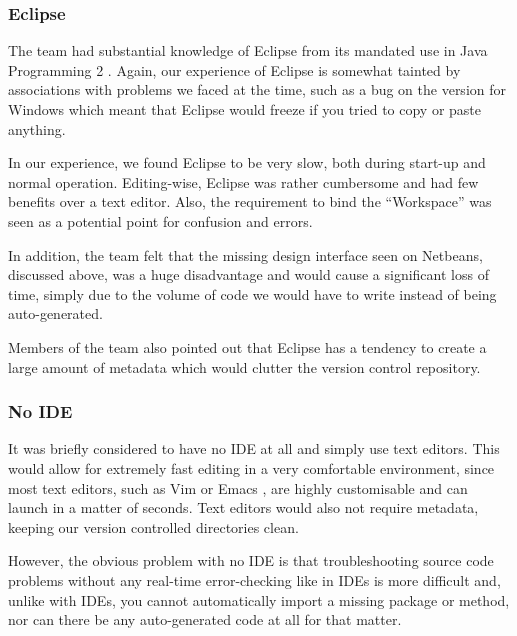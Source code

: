 \subsubsection{Eclipse}
\label{impl:ui:ide:eclipse}

The team had substantial knowledge of Eclipse from its mandated use in
Java Programming 2 \cite{javaProgramming2}. Again, our experience of 
Eclipse is somewhat tainted by associations with problems we faced at 
the time, such as a bug on the version for Windows which meant that 
Eclipse would freeze if you tried to copy or paste anything.

In our experience, we found Eclipse to be very slow, both during 
start-up and normal operation. 
Editing-wise, Eclipse was rather cumbersome and had few benefits over
a text editor.
Also, the requirement to bind the ``Workspace'' was seen as a potential
point for confusion and errors.

In addition, the team felt that the missing design interface seen on
Netbeans, discussed above, was a huge disadvantage and would cause a
significant loss of time, simply due to the volume of code we would
have to write instead of being auto-generated.

Members of the team also pointed out that Eclipse has a tendency to
create a large amount of metadata which would clutter the version
control repository.

\subsubsection{No IDE}
\label{impl:ui:ide:noide}

It was briefly considered to have no IDE at all and simply use text
editors.
This would allow for extremely fast editing in a very comfortable
environment, since most text editors, such as Vim \cite{vim} or Emacs
\cite{emacs}, are highly customisable and can launch in a matter of
seconds.
Text editors would also not require metadata, keeping our version
controlled directories clean.

However, the obvious problem with no IDE is that troubleshooting
source code problems without any real-time error-checking like in IDEs
is more difficult and, unlike with IDEs, you cannot automatically
import a missing package or method, nor can there be any
auto-generated code at all for that matter.

